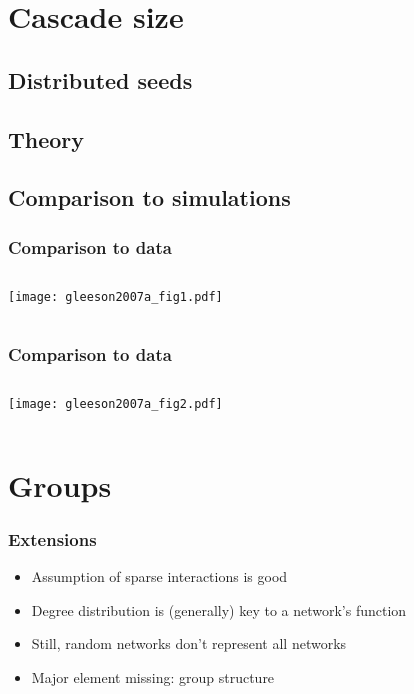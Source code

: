 \section{Cascade size}


\subsection{Distributed seeds}

\begin{frame}
  \frametitle{}
  
\end{frame}

\subsection{Theory}

\begin{frame}
  \frametitle{}
  
\end{frame}


\subsection{Comparison to simulations}

\begin{frame}
  \frametitle{Comparison to data}

  \begin{columns}
    \texttt{[image: gleeson2007a\_fig1.pdf]}
  \end{columns}
\end{frame}

\begin{frame}
  \frametitle{Comparison to data}

  \begin{columns}
    \texttt{[image: gleeson2007a\_fig2.pdf]}
  \end{columns}
\end{frame}

\section{Groups}

\begin{frame}
  \frametitle{Extensions}

  \begin{itemize}
  \item<1-> Assumption of sparse interactions is good
  \item<2-> Degree distribution is (generally) key to a network's function
  \item<3-> Still, random networks don't represent all networks
  \item<4-> Major element missing: \alert{group structure}
  \end{itemize}

\end{frame}

